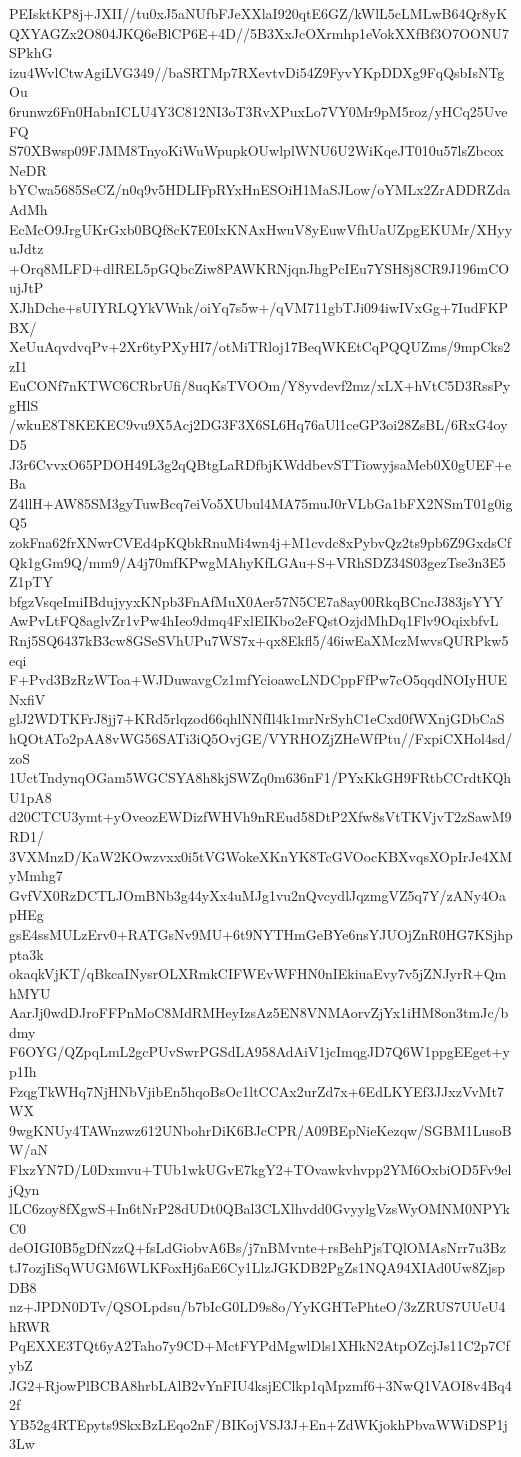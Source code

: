 PEIsktKP8j+JXII//tu0xJ5aNUfbFJeXXlaI920qtE6GZ/kWlL5cLMLwB64Qr8yK
QXYAGZx2O804JKQ6eBlCP6E+4D//5B3XxJcOXrmhp1eVokXXfBf3O7OONU7SPkhG
izu4WvlCtwAgiLVG349//baSRTMp7RXevtvDi54Z9FyvYKpDDXg9FqQsbIsNTgOu
6runwz6Fn0HabnICLU4Y3C812NI3oT3RvXPuxLo7VY0Mr9pM5roz/yHCq25UveFQ
S70XBwsp09FJMM8TnyoKiWuWpupkOUwlplWNU6U2WiKqeJT010u57lsZbcoxNeDR
bYCwa5685SeCZ/n0q9v5HDLIFpRYxHnESOiH1MaSJLow/oYMLx2ZrADDRZdaAdMh
EcMcO9JrgUKrGxb0BQf8cK7E0IxKNAxHwuV8yEuwVfhUaUZpgEKUMr/XHyyuJdtz
+Orq8MLFD+dlREL5pGQbcZiw8PAWKRNjqnJhgPcIEu7YSH8j8CR9J196mCOujJtP
XJhDche+sUIYRLQYkVWnk/oiYq7s5w+/qVM711gbTJi094iwIVxGg+7IudFKPBX/
XeUuAqvdvqPv+2Xr6tyPXyHI7/otMiTRloj17BeqWKEtCqPQQUZms/9mpCks2zI1
EuCONf7nKTWC6CRbrUfi/8uqKsTVOOm/Y8yvdevf2mz/xLX+hVtC5D3RssPygHlS
/wkuE8T8KEKEC9vu9X5Acj2DG3F3X6SL6Hq76aUl1ceGP3oi28ZsBL/6RxG4oyD5
J3r6CvvxO65PDOH49L3g2qQBtgLaRDfbjKWddbevSTTiowyjsaMeb0X0gUEF+eBa
Z4llH+AW85SM3gyTuwBcq7eiVo5XUbul4MA75muJ0rVLbGa1bFX2NSmT01g0igQ5
zokFna62frXNwrCVEd4pKQbkRnuMi4wn4j+M1cvdc8xPybvQz2ts9pb6Z9GxdsCf
Qk1gGm9Q/mm9/A4j70mfKPwgMAhyKfLGAu+S+VRhSDZ34S03gezTse3n3E5Z1pTY
bfgzVsqeImiIBdujyyxKNpb3FnAfMuX0Aer57N5CE7a8ay00RkqBCncJ383jsYYY
AwPvLtFQ8aglvZr1vPw4hIeo9dmq4FxlEIKbo2eFQstOzjdMhDq1Flv9OqixbfvL
Rnj5SQ6437kB3cw8GSeSVhUPu7WS7x+qx8Ekfl5/46iwEaXMczMwvsQURPkw5eqi
F+Pvd3BzRzWToa+WJDuwavgCz1mfYcioawcLNDCppFfPw7cO5qqdNOIyHUENxfiV
glJ2WDTKFrJ8jj7+KRd5rlqzod66qhlNNfIl4k1mrNrSyhC1eCxd0fWXnjGDbCaS
hQOtATo2pAA8vWG56SATi3iQ5OvjGE/VYRHOZjZHeWfPtu//FxpiCXHol4sd/zoS
1UctTndynqOGam5WGCSYA8h8kjSWZq0m636nF1/PYxKkGH9FRtbCCrdtKQhU1pA8
d20CTCU3ymt+yOveozEWDizfWHVh9nREud58DtP2Xfw8sVtTKVjvT2zSawM9RD1/
3VXMnzD/KaW2KOwzvxx0i5tVGWokeXKnYK8TcGVOocKBXvqsXOpIrJe4XMyMmhg7
GvfVX0RzDCTLJOmBNb3g44yXx4uMJg1vu2nQvcydlJqzmgVZ5q7Y/zANy4OapHEg
gsE4ssMULzErv0+RATGsNv9MU+6t9NYTHmGeBYe6nsYJUOjZnR0HG7KSjhppta3k
okaqkVjKT/qBkcaINysrOLXRmkCIFWEvWFHN0nIEkiuaEvy7v5jZNJyrR+QmhMYU
AarJj0wdDJroFFPnMoC8MdRMHeyIzsAz5EN8VNMAorvZjYx1iHM8on3tmJc/bdmy
F6OYG/QZpqLmL2gcPUvSwrPGSdLA958AdAiV1jcImqgJD7Q6W1ppgEEget+yp1Ih
FzqgTkWHq7NjHNbVjibEn5hqoBsOc1ltCCAx2urZd7x+6EdLKYEf3JJxzVvMt7WX
9wgKNUy4TAWnzwz612UNbohrDiK6BJcCPR/A09BEpNieKezqw/SGBM1LusoBW/aN
FlxzYN7D/L0Dxmvu+TUb1wkUGvE7kgY2+TOvawkvhvpp2YM6OxbiOD5Fv9eljQyn
lLC6zoy8fXgwS+In6tNrP28dUDt0QBal3CLXlhvdd0GvyylgVzsWyOMNM0NPYkC0
deOIGI0B5gDfNzzQ+fsLdGiobvA6Bs/j7nBMvnte+rsBehPjsTQlOMAsNrr7u3Bz
tJ7ozjIiSqWUGM6WLKFoxHj6aE6Cy1LlzJGKDB2PgZs1NQA94XIAd0Uw8ZjspDB8
nz+JPDN0DTv/QSOLpdsu/b7bIcG0LD9s8o/YyKGHTePhteO/3zZRUS7UUeU4hRWR
PqEXXE3TQt6yA2Taho7y9CD+MctFYPdMgwlDls1XHkN2AtpOZcjJs11C2p7CfybZ
JG2+RjowPlBCBA8hrbLAlB2vYnFIU4ksjEClkp1qMpzmf6+3NwQ1VAOI8v4Bq42f
YB52g4RTEpyts9SkxBzLEqo2nF/BIKojVSJ3J+En+ZdWKjokhPbvaWWiDSP1j3Lw
